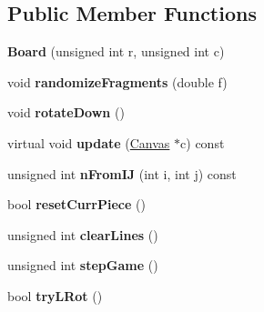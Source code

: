 \subsection*{Public Member Functions}
\begin{DoxyCompactItemize}
\item 
\hypertarget{class_tetris_1_1_board_a6787fe58bbfb7bcc7400efee29fb47ce}{{\bfseries Board} (unsigned int r, unsigned int c)}\label{class_tetris_1_1_board_a6787fe58bbfb7bcc7400efee29fb47ce}

\item 
\hypertarget{class_tetris_1_1_board_afe329c740af93e18f2590b17144ca835}{void {\bfseries randomize\-Fragments} (double f)}\label{class_tetris_1_1_board_afe329c740af93e18f2590b17144ca835}

\item 
\hypertarget{class_tetris_1_1_board_ab76b3272487da487860a40515f15ac6e}{void {\bfseries rotate\-Down} ()}\label{class_tetris_1_1_board_ab76b3272487da487860a40515f15ac6e}

\item 
\hypertarget{class_tetris_1_1_board_a4e07300bd30650055a6cdaf22d57da4f}{virtual void {\bfseries update} (\hyperlink{class_k_graph_1_1_canvas}{Canvas} $\ast$c) const }\label{class_tetris_1_1_board_a4e07300bd30650055a6cdaf22d57da4f}

\item 
\hypertarget{class_tetris_1_1_board_a7700484eab96db9a7495344e1caf8148}{unsigned int {\bfseries n\-From\-I\-J} (int i, int j) const }\label{class_tetris_1_1_board_a7700484eab96db9a7495344e1caf8148}

\item 
\hypertarget{class_tetris_1_1_board_a84807d05f925421a57583f32d6bd6597}{bool {\bfseries reset\-Curr\-Piece} ()}\label{class_tetris_1_1_board_a84807d05f925421a57583f32d6bd6597}

\item 
\hypertarget{class_tetris_1_1_board_a307d7ec8e765ffb6fde1803569062d7a}{unsigned int {\bfseries clear\-Lines} ()}\label{class_tetris_1_1_board_a307d7ec8e765ffb6fde1803569062d7a}

\item 
\hypertarget{class_tetris_1_1_board_aab0b1b4cf3640addf3d7428d9e0c9f36}{unsigned int {\bfseries step\-Game} ()}\label{class_tetris_1_1_board_aab0b1b4cf3640addf3d7428d9e0c9f36}

\item 
\hypertarget{class_tetris_1_1_board_a346f054640b8f39269b092554052e709}{bool {\bfseries try\-L\-Rot} ()}\label{class_tetris_1_1_board_a346f054640b8f39269b092554052e709}


\end{DoxyCompactItemize}
